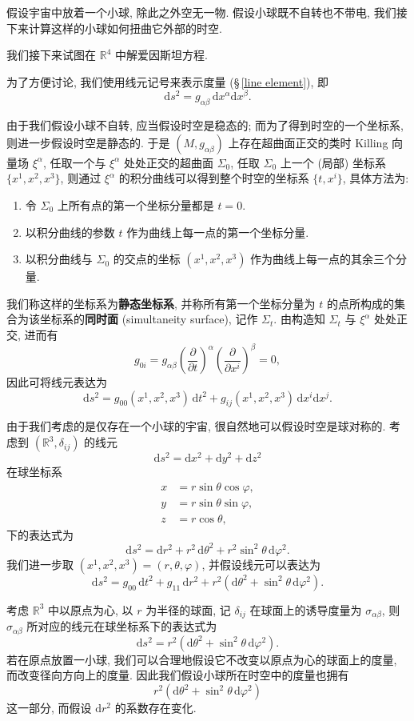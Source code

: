 假设宇宙中放着一个小球, 除此之外空无一物. 假设小球既不自转也不带电, 我们接下来计算这样的小球如何扭曲它外部的时空.

\begin{remark}
	我们接下来试图在 $\mathbb{R}^4$ 中解爱因斯坦方程.
\end{remark}

为了方便讨论, 我们使用线元记号来表示度量 (\S\,\ref{line element}), 即
\[ \mathrm{d}s^2=g_{\alpha\beta}\,\mathrm{d}x^{\alpha}\mathrm{d}x^{\beta}. \]

由于我们假设小球不自转, 应当假设时空是稳态的; 而为了得到时空的一个坐标系, 则进一步假设时空是静态的. 于是 $(M,g_{\alpha\beta})$ 上存在超曲面正交的类时 Killing 向量场 $\xi^{\alpha}$, 任取一个与 $\xi^{\alpha}$ 处处正交的超曲面 $\Sigma_0$, 任取 $\Sigma_0$ 上一个 (局部) 坐标系 $\{x^1,x^2,x^3\}$, 则通过 $\xi^{\alpha}$ 的积分曲线可以得到整个时空的坐标系 $\{t,x^i\}$, 具体方法为:
\begin{enumerate}
	\item 令 $\Sigma_0$ 上所有点的第一个坐标分量都是 $t=0$.
	\item 以积分曲线的参数 $t$ 作为曲线上每一点的第一个坐标分量.
	\item 以积分曲线与 $\Sigma_0$ 的交点的坐标 $(x^1,x^2,x^3)$ 作为曲线上每一点的其余三个分量.
\end{enumerate}
我们称这样的坐标系为{\bf 静态坐标系}, 并称所有第一个坐标分量为 $t$ 的点所构成的集合为该坐标系的{\bf 同时面} (simultaneity surface), 记作 $\Sigma_t$. 由构造知 $\Sigma_t$ 与 $\xi^{\alpha}$ 处处正交, 进而有
\[ g_{0i}=g_{\alpha\beta}\left( \frac{\partial }{\partial t} \right)^{\alpha}\left( \frac{\partial }{\partial x^i} \right)^{\beta}=0, \] 
因此可将线元表达为
\[ \mathrm{d}s^2=g_{00}(x^1,x^2,x^3)\,\mathrm{d}t^2+g_{ij}(x^1,x^2,x^3)\,\mathrm{d}x^i\mathrm{d}x^j. \] 

由于我们考虑的是仅存在一个小球的宇宙, 很自然地可以假设时空是球对称的. 考虑到 $(\mathbb{R}^3,\delta_{ij})$ 的线元
\[ \mathrm{d}s^2=\mathrm{d}x^2+\mathrm{d}y^2+\mathrm{d}z^2 \] 
在球坐标系
\[ \begin{aligned}
	x &= r\sin\theta\cos\varphi,\\
	y &= r\sin\theta\sin\varphi,\\
	z &= r\cos\theta,
\end{aligned} \]
下的表达式为
\[ \mathrm{d}s^2=\mathrm{d}r^2+r^2\,\mathrm{d}\theta^2+r^2\sin^2\theta\,\mathrm{d}\varphi^2. \] 
我们进一步取 $(x^1,x^2,x^3)=(r,\theta,\varphi)$, 并假设线元可以表达为
\[ \mathrm{d}s^2=g_{00}\,\mathrm{d}t^2+g_{11}\,\mathrm{d}r^2+r^2(\mathrm{d}\theta^2+\sin^2\theta\,\mathrm{d}\varphi^2). \] 
\begin{remark}
	考虑 $\mathbb{R}^3$ 中以原点为心, 以 $r$ 为半径的球面, 记 $\delta_{ij}$ 在球面上的诱导度量为 $\sigma_{\alpha\beta}$, 则 $\sigma_{\alpha\beta}$ 所对应的线元在球坐标系下的表达式为
	\[ \mathrm{d}s^2=r^2(\mathrm{d}\theta^2+\sin^2\theta\,\mathrm{d}\varphi^2). \]
	若在原点放置一小球, 我们可以合理地假设它不改变以原点为心的球面上的度量, 而改变径向方向上的度量. 因此我们假设小球所在时空中的度量也拥有
	\[ r^2(\mathrm{d}\theta^2+\sin^2\theta\,\mathrm{d}\varphi^2) \] 
	这一部分, 而假设 $\mathrm{d}r^2$ 的系数存在变化.
\end{remark}

